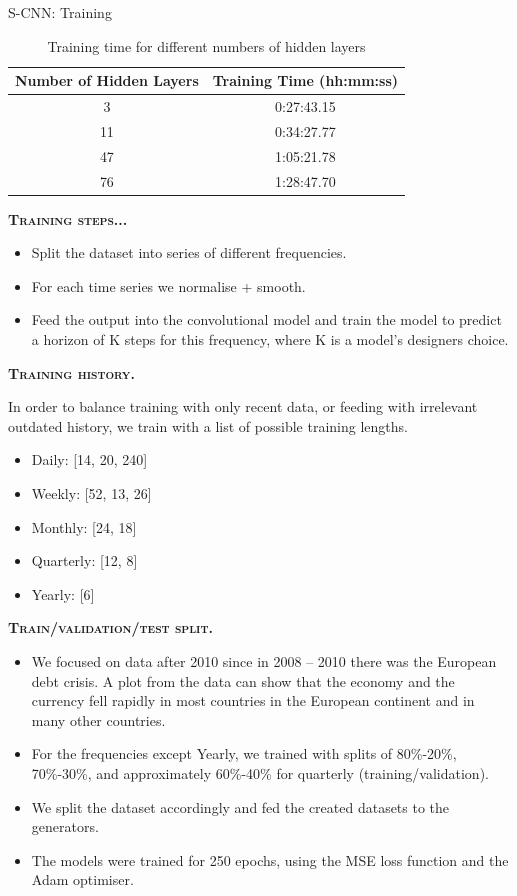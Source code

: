 \documentclass[aspectratio=169, 12pt]{beamer}
\begin{document}
\begin{frame}[allowframebreaks]{S-CNN: Training}
\begin{table}[htbp]
\centering
\caption{Training time for different numbers of hidden layers}
\begin{tabular}{cc}
\toprule
Number of Hidden Layers & Training Time (hh:mm:ss) \\
\midrule
3 & 0:27:43.15 \\
11 & 0:34:27.77 \\
47 & 1:05:21.78 \\
76 & 1:28:47.70 \\
\bottomrule
\end{tabular}
\end{table}
\begin{center}
    \textsc{\textbf{Training steps...}}
\end{center}
\begin{itemize}
\item Split the dataset into series of different frequencies.
\item For each time series we normalise + smooth.
\item Feed the output into the convolutional model and train the model to predict a horizon of K steps for this frequency, where K is a model’s designers choice.
\end{itemize}
\newpage
\begin{center}
    \textsc{\textbf{Training history.}}
\end{center}
In order to balance training with only recent data, or feeding with irrelevant outdated history, we train with a list of possible training lengths.
\begin{itemize}
    \item Daily: [14, 20, 240]
    \item Weekly: [52, 13, 26]
    \item Monthly: [24, 18]
    \item Quarterly: [12, 8]
    \item Yearly: [6]
\end{itemize}
\newpage
\begin{center}
    \textsc{\textbf{Train/validation/test split.}}
\end{center}
\begin{itemize}
    \item We focused on data after 2010 since in 2008 – 2010 there was the European debt crisis. A plot from the data can show that the economy and the currency fell rapidly in most countries in the European continent and in many other countries.
    \item For the frequencies except Yearly, we trained with splits of 80\%-20\%, 70\%-30\%, and approximately 60\%-40\% for quarterly (training/validation).
    \item We split the dataset accordingly and fed the created datasets to the generators.
    \item The models were trained for 250 epochs, using the MSE loss function and the Adam optimiser.
\end{itemize}

\end{frame}
\end{document}
